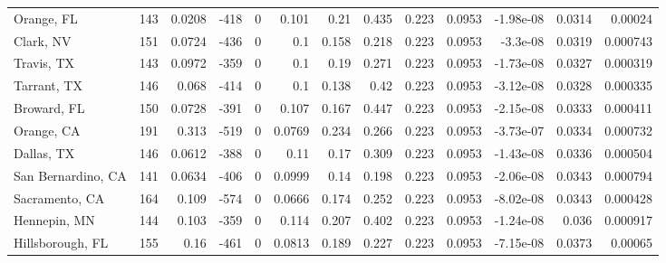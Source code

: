 \documentclass[12pt,letterpaper]{article}
\begin{document}
\begin{sidewaystable}
{\begin{tabular}{lrrrrrrrrrrrr}
 Orange, FL         & 143   & 0.0208  & -418   &     0 &          0.101  &            0.21  &         0.435  &        0.223 &       0.0953 &        -1.98e-08 &           0.0314  &        0.00024  \\
 Clark, NV          & 151   & 0.0724  & -436   &     0 &          0.1    &            0.158 &         0.218  &        0.223 &       0.0953 &        -3.3e-08  &           0.0319  &        0.000743 \\
 Travis, TX         & 143   & 0.0972  & -359   &     0 &          0.1    &            0.19  &         0.271  &        0.223 &       0.0953 &        -1.73e-08 &           0.0327  &        0.000319 \\
 Tarrant, TX        & 146   & 0.068   & -414   &     0 &          0.1    &            0.138 &         0.42   &        0.223 &       0.0953 &        -3.12e-08 &           0.0328  &        0.000335 \\
 Broward, FL        & 150   & 0.0728  & -391   &     0 &          0.107  &            0.167 &         0.447  &        0.223 &       0.0953 &        -2.15e-08 &           0.0333  &        0.000411 \\
 Orange, CA         & 191   & 0.313   & -519   &     0 &          0.0769 &            0.234 &         0.266  &        0.223 &       0.0953 &        -3.73e-07 &           0.0334  &        0.000732 \\
 Dallas, TX         & 146   & 0.0612  & -388   &     0 &          0.11   &            0.17  &         0.309  &        0.223 &       0.0953 &        -1.43e-08 &           0.0336  &        0.000504 \\
 San Bernardino, CA & 141   & 0.0634  & -406   &     0 &          0.0999 &            0.14  &         0.198  &        0.223 &       0.0953 &        -2.06e-08 &           0.0343  &        0.000794 \\
 Sacramento, CA     & 164   & 0.109   & -574   &     0 &          0.0666 &            0.174 &         0.252  &        0.223 &       0.0953 &        -8.02e-08 &           0.0343  &        0.000428 \\
 Hennepin, MN       & 144   & 0.103   & -359   &     0 &          0.114  &            0.207 &         0.402  &        0.223 &       0.0953 &        -1.24e-08 &           0.036   &        0.000917 \\
 Hillsborough, FL   & 155   & 0.16    & -461   &     0 &          0.0813 &            0.189 &         0.227  &        0.223 &       0.0953 &        -7.15e-08 &           0.0373  &        0.00065  \\

\end{tabular}}
\end{sidewaystable}
\end{document}
